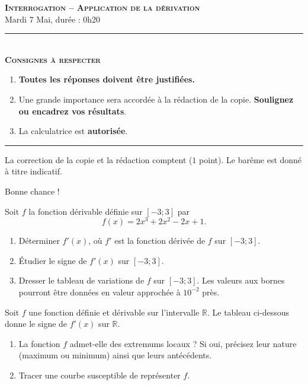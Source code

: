 \documentclass[11pt]{article}
\begin{document}
%
%


\begin{center}
\textbf{\LARGE \textsc{Interrogation -- Application de la dérivation}}\\[2mm]

{\large Mardi 7 Mai, durée : 0h20}\\[1mm]
\noindent\rule{8cm}{0.4pt}\\[1mm]
\textbf{\textsc{Consignes à respecter}}
\begin{enumerate}[label=\textbf{\arabic*/}]
\item \textbf{Toutes les réponses doivent être justifiées.}
\item Une grande importance sera accordée à la rédaction de la
  copie. \textbf{Soulignez ou encadrez vos résultats}.
\item La calculatrice est \textbf{autorisée}.
    \end{enumerate}
\noindent\rule{12cm}{0.4pt}
\end{center}

\noindent La correction de la copie et la rédaction comptent ($1$ point). Le
barême est donné à titre indicatif.
\begin{center}
  Bonne chance !
\end{center}

\begin{exo}[$5$ points]
  Soit $f$ la fonction dérivable définie sur $[-3; 3]$ par
  \[
    f(x) = 2x^3 + 2x^2 - 2x + 1.
  \]
  \begin{enumerate}
    \item Déterminer $f'(x)$, où $f'$ est la fonction dérivée de $f$ sur $[-3;
      3]$.
    \item Étudier le signe de $f'(x)$ sur $[-3; 3]$.
    \item Dresser le tableau de variations de $f$ sur $[-3; 3]$. Les valeurs aux
      bornes pourront être données en valeur approchée à $10^{-2}$ près.
  \end{enumerate}
\end{exo}

\begin{exo}[$4$ points]
  Soit $f$ une fonction définie et dérivable sur l'intervalle $\mathbb{R}$. Le
  tableau ci-dessous donne le signe de $f'(x)$ sur $\mathbb{R}$.
  \begin{center}
  \end{center}
  \begin{enumerate}
    \item La fonction $f$ admet-elle des extremums locaux ? Si oui, précisez
      leur nature (maximum ou minimum) ainsi que leurs antécédents.
    \item Tracer une courbe susceptible de représenter $f$.
  \end{enumerate}
\end{exo}
\end{document}
